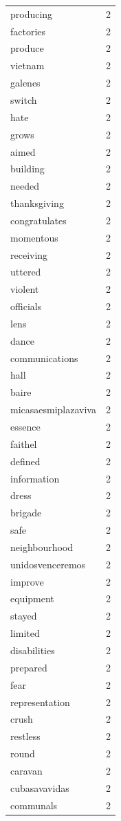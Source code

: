 \begin{tabular}{lr}
producing & 2 \\
factories & 2 \\
produce & 2 \\
vietnam & 2 \\
galenes & 2 \\
switch & 2 \\
hate & 2 \\
grows & 2 \\
aimed & 2 \\
building & 2 \\
needed & 2 \\
thanksgiving & 2 \\
congratulates & 2 \\
momentous & 2 \\
receiving & 2 \\
uttered & 2 \\
violent & 2 \\
officials & 2 \\
lens & 2 \\
dance & 2 \\
communications & 2 \\
hall & 2 \\
baire & 2 \\
micasaesmiplazaviva & 2 \\
essence & 2 \\
faithel & 2 \\
defined & 2 \\
information & 2 \\
dress & 2 \\
brigade & 2 \\
safe & 2 \\
neighbourhood & 2 \\
unidosvenceremos & 2 \\
improve & 2 \\
equipment & 2 \\
stayed & 2 \\
limited & 2 \\
disabilities & 2 \\
prepared & 2 \\
fear & 2 \\
representation & 2 \\
crush & 2 \\
restless & 2 \\
round & 2 \\
caravan & 2 \\
cubasavavidas & 2 \\
communals & 2 \\

\end{tabular}
